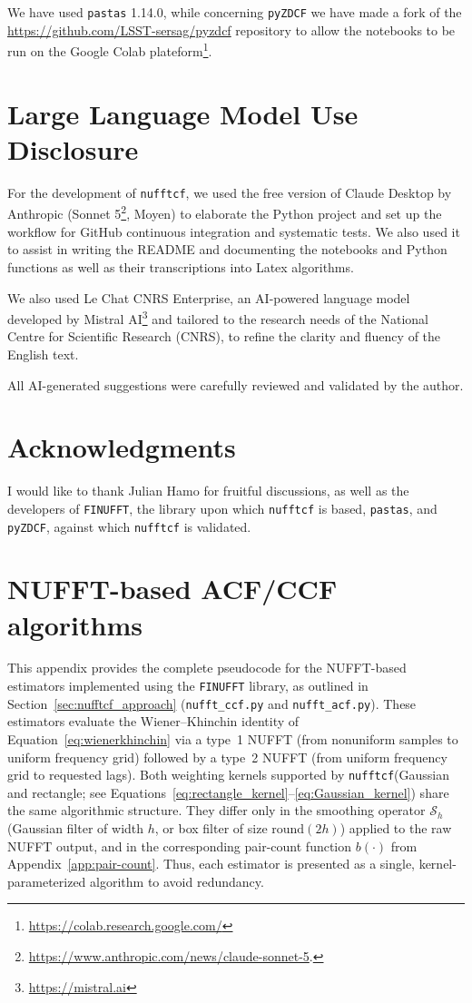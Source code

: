 \documentclass[twocolumn,10pt]{article}
\newcommand{\nufftcf}{\texttt{nufftcf}\xspace}
\newcommand{\pastas}{\texttt{pastas}\xspace}
\newcommand{\pyzdcf}{\texttt{pyZDCF}\xspace}
\begin{document}
We have used \pastas 1.14.0, while concerning \pyzdcf we have made a fork of the \url{https://github.com/LSST-sersag/pyzdcf} repository to allow the notebooks to be run
on the Google Colab plateform\footnote{\url{https://colab.research.google.com/}}.   
%
\section*{Large Language Model Use Disclosure}
For the development of \nufftcf, we used the free version of Claude Desktop by Anthropic (Sonnet 5\footnote{\url{https://www.anthropic.com/news/claude-sonnet-5}.}, Moyen) to elaborate the Python project and set up the workflow for GitHub continuous integration and systematic tests. We also used it to assist in writing the README and documenting the notebooks and Python functions as well as their transcriptions into Latex algorithms. 

We also used Le Chat CNRS Enterprise, an AI-powered language model developed by Mistral AI\footnote{\url{https://mistral.ai}} and tailored to the research needs of the National Centre for Scientific Research (CNRS), to refine the clarity and fluency of the English text.

All AI-generated suggestions were carefully reviewed and validated by the author.
%
\section*{Acknowledgments}
I would like to thank Julian Hamo for fruitful discussions, as well as the developers 
of \texttt{FINUFFT}, the library upon which \nufftcf is based, \pastas, and \pyzdcf, 
against which \nufftcf is validated.
%
%


%
\appendix
\section{NUFFT-based ACF/CCF algorithms}
\label{app:algorithms}
This appendix provides the complete pseudocode for the
NUFFT-based estimators implemented using the \texttt{FINUFFT} library,
 as outlined in Section~\ref{sec:nufftcf_approach}
(\texttt{nufft\_ccf.py} and \texttt{nufft\_acf.py}). These estimators evaluate the
Wiener--Khinchin identity of Equation~\ref{eq:wienerkhinchin} via a
type~1 NUFFT (from nonuniform samples to uniform frequency grid) followed
by a type~2 NUFFT (from uniform frequency grid to requested lags). Both
weighting kernels supported by \nufftcf (Gaussian and rectangle; see
Equations~\ref{eq:rectangle_kernel}--\ref{eq:Gaussian_kernel}) share
the same algorithmic structure.  They differ only in the smoothing
operator $\mathcal{S}_h$ (Gaussian filter of width $h$, or box filter
of size $\mathrm{round}(2h)$) applied to the raw NUFFT output, and in
the corresponding pair-count function $b(\cdot)$ from
Appendix~\ref{app:pair-count}. Thus, each estimator is presented as a single, 
kernel-parameterized algorithm to avoid redundancy.
%
\end{document}
